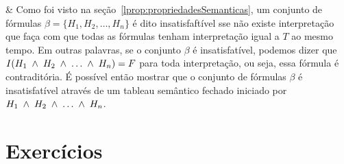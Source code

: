 \begin{easylist}

& Como foi visto na seção~\ref{lprop:propriedadesSemanticas}, um conjunto de fórmulas $\beta = \{H_1, H_2, \dots, H_n\}$ é dito insatisfaftível sse não existe interpretação que faça com que todas as fórmulas tenham interpretação igual a $T$ ao mesmo tempo. Em outras palavras, se o conjunto $\beta$ é insatisfatível, podemos dizer que $I(H_1 \;\land\; H_2 \;\land\; \dots \;\land\; H_n) = F$ para toda interpretação, ou seja, essa fórmula é contraditória. É possível então mostrar que o conjunto de fórmulas $\beta$ é insatisfatível através de um tableau semântico fechado iniciado por $H_1 \;\land\; H_2 \;\land\; \dots \;\land\; H_n$.


\end{easylist}




\section{Exercícios}


